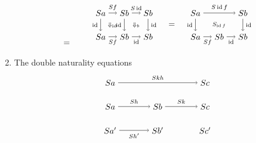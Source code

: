 \documentclass{amsart}
\DeclareMathOperator{\id}{id}
\theoremstyle{remark}
\theoremstyle{definition}
\begin{document}
\begin{enumerate}
\[\begin{tikzpicture}
    \node () at (3,0.5) {$ = $};
  \end{tikzpicture}
  \quad \quad
  \begin{tikzpicture}
  \begin{scope}
      \node (1) at (0,1) {$ Sa $};
      \node (2) at (1,1) {$ Sb $};
      \node (3) at (2,1) {$ Sb $};
      \node (4) at (0,0) {$ Sa $};
      \node (5) at (1,0) {$ Sb $};
      \node (6) at (2,0) {$ Sb $};
      \draw [->] (1) to node [above] {\scriptsize{$ Sf $}} (2);
      \draw [->] (2) to node [above] {\scriptsize{$ S \id $}} (3);
      \draw [->] (4) to node [below] {\scriptsize{$ Sf $}} (5);
      \draw [->] (5) to node [below] {\scriptsize{$ \id $}} (6);
      \draw [->] (1) to node [left] {\scriptsize{$ \id $}} (4);
      \draw [->] (2) to node [left] {\scriptsize{$ \id $}} (5);
      \draw [->] (3) to node [right] {\scriptsize{$ \id $}} (6);
      \node () at (0.5,0.5) {\scriptsize{$ \Downarrow_{\id} $}};
      \node () at (1.5,0.5) {\scriptsize{$ \Downarrow_b $}};
    \end{scope}
    \begin{scope}[shift={(4,0)}]
      \node (1) at (0,1) {$ Sa $};
      \node (3) at (2,1) {$ Sb $};
      \node (4) at (0,0) {$ Sa $};
      \node (5) at (1,0) {$ Sb $};
      \node (6) at (2,0) {$ Sb $};
      \draw [->] (1) to node [above] {\scriptsize{$ S \id f $}} (3);
      \draw [->] (4) to node [below] {\scriptsize{$ Sf $}} (5);
      \draw [->] (5) to node [below] {\scriptsize{$ \id $}} (6);
      \draw [->] (1) to node [left] {\scriptsize{$ \id $}} (4);
      \draw [->] (3) to node [right] {\scriptsize{$ \id $}} (6);
      \node () at (1,0.5) {\scriptsize{$ S_{\id f} $}};
    \end{scope}
    \node () at (3,0.5) {$ = $};
    \end{tikzpicture}
  \]
\item The double naturality equations
  \[
    \begin{tikzpicture}
    \begin{scope}
      \node (1) at (0,2) {$ Sa $};
      \node (2) at (4,2) {$ Sc $};
      \node (3) at (0,1) {$ Sa $};
      \node (4) at (2,1) {$ Sb $};
      \node (5) at (4,1) {$ Sc $};
      \node (6) at (0,0) {$ Sa' $};
      \node (7) at (2,0) {$ Sb' $};
      \node (8) at (4,0) {$ Sc' $};
      \draw [->] (1) to node [above] {\scriptsize{$ Skh $}} (2);
      \draw [->] (3) to node [above] {\scriptsize{$ Sh $}} (4);
      \draw [->] (4) to node [above] {\scriptsize{$ Sk $}} (5);
      \draw [->] (6) to node [below] {\scriptsize{$ Sh' $}} (7);

\end{scope}
\end{tikzpicture}\]
\end{enumerate}
\end{document}

